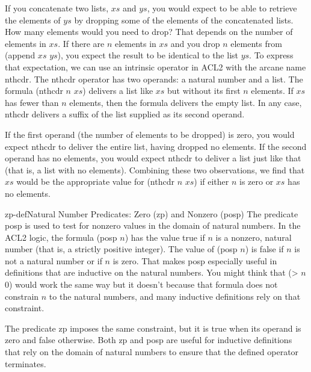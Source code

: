 If you concatenate two lists, $xs$ and $ys$,
you would expect to be able to retrieve the elements
of $ys$ by dropping some of the elements of the concatenated lists.
How many elements would you need to drop?
That depends on the number of elements in $xs$.
If there are $n$ elements in $xs$ and you drop $n$ elements
from \textsf{(append $xs$ $ys$)}, you expect the result to be identical
to the list $ys$. To express that expectation, we can use
an intrinsic operator in ACL2 with the arcane name \textsf{nthcdr}.
The \textsf{nthcdr} operator has two operands: a natural number and a list.
The formula \textsf{(nthcdr $n$ $xs$)} delivers a list like $xs$
but without its first $n$ elements.
If $xs$ has fewer than $n$ elements,
then the formula delivers the empty list.
In any case, \textsf{nthcdr} delivers a suffix of the list
supplied as its second operand.

If the first operand (the number of elements to be dropped) is zero,
you would expect
\textsf{nthcdr} to deliver the entire list, having dropped no elements.
If the second operand has no elements,
you would expect
\textsf{nthcdr} to deliver a list just like that
(that is, a list with no elements).
Combining these two observations, we find that
$xs$ would be the appropriate value for \textsf{(nthcdr $n$ $xs$)}
if either $n$ is zero or $xs$ has no elements.

\begin{aside}{zp-def}{Natural Number Predicates: Zero (\textsf{zp}) and Nonzero (\textsf{posp})}
The predicate \textsf{posp} is used to test for nonzero values
in the domain of natural numbers.
In the ACL2 logic, the formula \textsf{(posp $n$)} has the value true if $n$ is
a nonzero, natural number (that is, a strictly positive integer).
The value of \textsf{(posp $n$)} is false if $n$ is not a natural number
or if $n$ is zero.
That makes \textsf{posp} especially useful
in definitions that are inductive on the natural numbers.
You might think that \textsf{(> $n$ 0)} would
work the same way but it doesn't because that formula %
does not constrain $n$ to the natural numbers,
and many inductive definitions rely on that constraint.

The predicate \textsf{zp} imposes the same constraint,
but it is true when its operand is zero and false otherwise.
Both \textsf{zp} and \textsf{posp} are useful for inductive definitions that
rely on the domain of natural numbers to ensure that the defined operator
terminates.
\end{aside}

